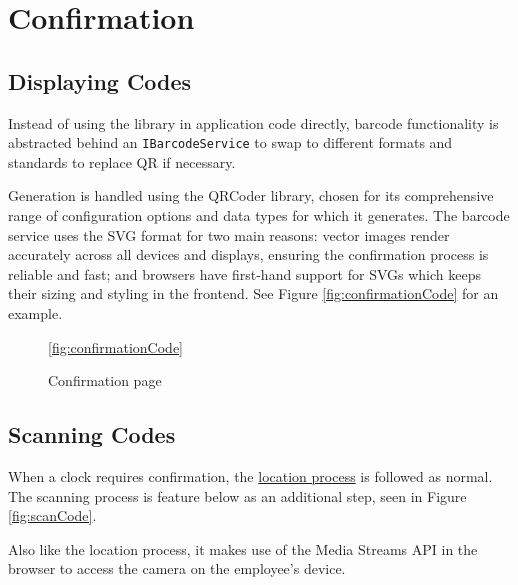 \section{Confirmation}

\subsection{Displaying Codes}

Instead of using the library in application code directly,
barcode functionality is abstracted behind an
\lstinline{IBarcodeService} to swap to different formats
and standards to replace QR if necessary.

Generation is handled using the QRCoder library, chosen for
its comprehensive range of configuration options and data
types for which it generates.
The barcode service uses the SVG format for two main
reasons: vector images render accurately across all devices
and displays, ensuring the confirmation process is reliable
and fast; and browsers have first-hand support for SVGs
which keeps their sizing and styling in the frontend.
See Figure \ref{fig:confirmationCode} for an example.

\begin{figure}[h]
  \centering
  \caption{Confirmation page}
  \ref{fig:confirmationCode}
\end{figure} 

\subsection{Scanning Codes}

When a clock requires confirmation, the 
\hyperref[s:providingLocation]{location process} is
followed as normal. The scanning process is feature below as
an additional step, seen in Figure \ref{fig:scanCode}. 

Also like the location process, it makes use of the 
Media Streams API in the browser to access the camera on the
employee's device. 